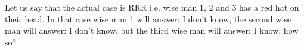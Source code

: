 Let us say that the actual case is RRR i.e. wise man 1, 2 and 3 has a red hat on their head.
In that case wise man 1 will answer: I don't know, the second wise man will answer: I don't know, but the third wise man will answer: I know, how so?



